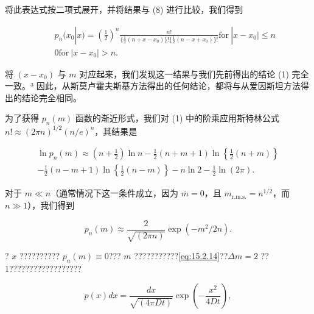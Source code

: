 将此表达式按二项式展开，并将结果与 (8) 进行比较，我们得到

\begin{equation}\tag{15.2.13}\label{eq:15.2.13}
\begin{array}{rlr} & { } & { p _ { n } ( x _ { 0 } | x ) = \left( \frac { 1 } { 2 } \right) ^{n} \frac { n ! } { \{ \frac { 1 } { 2 } ( n + x - x _ { 0 } ) \} ! \{ \frac { 1 } { 2 } ( n - x + x _ { 0 } ) \} ! }  \mathrm { f o r } \ | x - x _ { 0 } | \leq n } \\& { } & { 0         \mathrm { f o r } \ | x - x _ { 0 } | > n . } \end{array}
\end{equation}

将 \((x-x_{0})\) 与 \(m\) 对应起来，我们发现这一结果与我们先前得出的结论 (1) 完全一致。³ 因此，从斯莫卢霍夫斯基方法得出的任何结论，都将与从爱因斯坦方法得出的结论完全相同。

为了获得 \(p_{n}(m)\) 函数的渐近形式，我们对 (1) 中的阶乘应用斯特林公式 \(n! \approx (2\pi n)^{1/2}(n/e)^{n}\)，其结果是

\begin{equation}\tag{15.2.14}\label{eq:15.2.14}
\begin{array}{r} { \ln p _ { n } ( m ) \approx \left( n + \frac { 1 } { 2 } \right) \ln n - \frac { 1 } { 2 } ( n + m + 1 ) \ln \left\{ \frac { 1 } { 2 } ( n + m ) \right\} } \\{ - \frac { 1 } { 2 } ( n - m + 1 ) \ln \left\{ \frac { 1 } { 2 } ( n - m ) \right\} - n \ln 2 - \frac { 1 } { 2 } \ln ( 2 \pi ) . } \end{array}
\end{equation}

对于 \(m \ll n\)（通常情况下这一条件成立，因为 \(\overline{m} = 0\)，且 \(m_{\text{r.m.s.}} = n^{1/2}\)，而 \(n \gg 1\)），我们得到

\begin{equation}\tag{15.2.15}\label{eq:15.2.15}
p _ { n } ( m ) \approx \frac { 2 } { \sqrt { ( 2 \pi n ) } } \exp ( - m ^{2} / 2 n ) .
\end{equation}

? \(x\) ?????????? \(p_{n}(m) \equiv 0\)??? \(m\) ???????????\autoref{eq:15.2.14}??\(\Delta m = 2\) ?? 1??????????????????

\begin{equation}\tag{15.2.16}\label{eq:15.2.16}
p ( x ) d x = { \frac { d x } { \sqrt { ( 4 \pi D t ) } } } \exp \left( - { \frac { x ^{2} } { 4 D t } } \right) ,
\end{equation}


